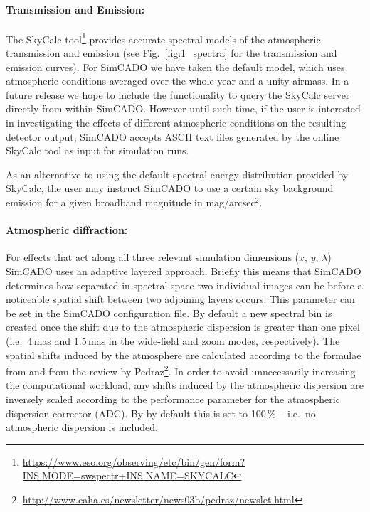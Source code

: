 \paragraph{Transmission and Emission:} 
The SkyCalc tool\footnote{\url{https://www.eso.org/observing/etc/bin/gen/form?INS.MODE=swspectr+INS.NAME=SKYCALC}} \citep{skycalc1, skycalc2} provides accurate spectral models of the atmospheric transmission and emission (see Fig.~\ref{fig:1_spectra} for the transmission and emission curves). For SimCADO we have taken the default model, which uses atmospheric conditions averaged over the whole year and a unity airmass. In a future release we hope to include the functionality to query the SkyCalc server directly from within SimCADO. However until such time, if the user is interested in investigating the effects of different atmospheric conditions on the resulting detector output, SimCADO accepts ASCII text files generated by the online SkyCalc tool as input for simulation runs.

As an alternative to using the default spectral energy distribution provided by SkyCalc, the user may instruct SimCADO to use a certain sky background emission for a given broadband magnitude in mag/arcsec$^2$. 

\paragraph{Atmospheric diffraction:} 
For effects that act along all three relevant simulation dimensions ($x$, $y$, $\lambda$) SimCADO uses an adaptive layered approach. Briefly this means that SimCADO determines how separated in spectral space two individual images can be before a noticeable spatial shift between two adjoining layers occurs. This parameter can be set in the SimCADO configuration file. By default a new spectral bin is created once the shift due to the atmospheric dispersion is greater than one pixel (i.e.\ 4\,mas and 1.5\,mas in the wide-field and zoom modes, respectively). The spatial shifts induced by the atmosphere are calculated according to the formulae from \citet{stone1996} and from the review by Pedraz\footnote{\url{http://www.caha.es/newsletter/news03b/pedraz/newslet.html}}. In order to avoid unnecessarily increasing the computational workload, any shifts induced by the atmospheric dispersion are inversely scaled according to the performance parameter for the atmospheric dispersion corrector (ADC). By by default this is set to 100\,\% -- i.e.\ no atmospheric dispersion is included.

